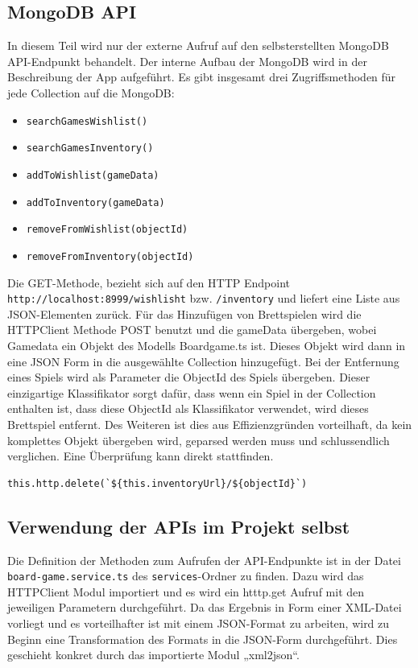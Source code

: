 \subsection{MongoDB API}
In diesem Teil wird nur der externe Aufruf auf den selbsterstellten MongoDB \ac{API}-Endpunkt behandelt. 
Der interne Aufbau der MongoDB wird in der Beschreibung der App aufgeführt. Es gibt insgesamt drei Zugriffsmethoden für jede Collection auf die MongoDB: 
\begin{itemize}
    \item \texttt{searchGamesWishlist()}
    \item \texttt{searchGamesInventory()}
    \item \texttt{addToWishlist(gameData)}
    \item \texttt{addToInventory(gameData)}
    \item \texttt{removeFromWishlist(objectId)}
    \item \texttt{removeFromInventory(objectId)}
\end{itemize}
Die GET-Methode, bezieht sich auf den HTTP Endpoint
\texttt{http://localhost:8999/wishlisht} bzw. \texttt{/inventory} und liefert eine Liste aus JSON-Elementen zurück.
Für das Hinzufügen von Brettspielen wird die HTTPClient Methode POST benutzt und die gameData übergeben, wobei Gamedata ein Objekt des Modells Boardgame.ts ist. 
Dieses Objekt wird dann in eine JSON Form in die ausgewählte Collection hinzugefügt. Bei der Entfernung eines Spiels wird als Parameter die ObjectId des Spiels übergeben.
Dieser einzigartige Klassifikator sorgt dafür, dass wenn ein Spiel in der Collection enthalten ist, dass diese ObjectId als Klassifikator verwendet, wird dieses Brettspiel entfernt.
Des Weiteren ist dies aus Effizienzgründen vorteilhaft, da kein komplettes Objekt übergeben wird, geparsed werden muss und schlussendlich verglichen. Eine Überprüfung kann direkt stattfinden.
\begin{center}
    \begin{lstlisting}[caption={Löschaufruf der MongoDB API}, label=lst:jscode]
    this.http.delete(`${this.inventoryUrl}/${objectId}`)
\end{lstlisting}
\end{center}


\subsection{Verwendung der APIs im Projekt selbst}
Die Definition der Methoden zum Aufrufen der \ac{API}-Endpunkte ist in der Datei \\\texttt{board-game.service.ts} des \texttt{services}-Ordner zu finden.
Dazu wird das HTTPClient Modul importiert und es wird ein htttp.get Aufruf mit den jeweiligen Parametern durchgeführt. Da das Ergebnis in Form einer XML-Datei vorliegt und es vorteilhafter ist mit einem JSON-Format zu arbeiten, wird zu Beginn eine Transformation des Formats in die JSON-Form durchgeführt.
Dies geschieht konkret durch das importierte Modul „xml2json“. \bigskip 

